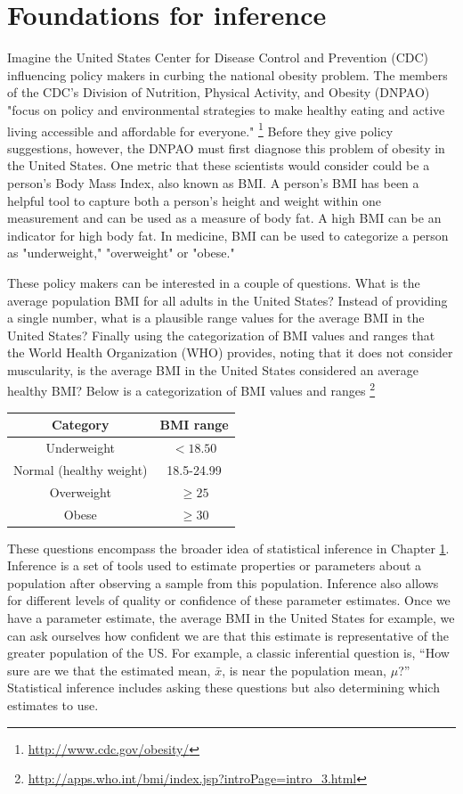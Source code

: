 \chapter{Foundations for inference}
\label{foundationsForInference}

Imagine the United States Center for Disease Control and Prevention (CDC) influencing policy makers in curbing the national obesity problem. The members of the CDC's Division of Nutrition, Physical Activity, and Obesity (DNPAO) "focus on policy and environmental strategies to make healthy eating and active living accessible and affordable for everyone." \footnote{\url{http://www.cdc.gov/obesity/}} Before they give policy suggestions, however, the DNPAO must first diagnose this problem of obesity in the United States. One metric that these scientists would consider could be a person's Body Mass Index, also known as BMI. A person's BMI has been a helpful tool to capture both a person's height and weight within one measurement and can be used as a measure of body fat. A high BMI can be an indicator for high body fat. In medicine, BMI can be used to categorize a person as "underweight," "overweight" or "obese." 

These policy makers can be interested in a couple of questions. What is the average population BMI for all adults in the United States? Instead of providing a single number, what is a plausible range values for the average BMI in the United States? Finally using the categorization of BMI values and ranges that the World Health Organization (WHO) provides, noting that it does not consider muscularity, is the average BMI in the United States considered an average healthy BMI? Below is a categorization of BMI values and ranges
\footnote{\url{http://apps.who.int/bmi/index.jsp?introPage=intro_3.html}}

\begin{center}
\begin{tabular}{|c|c|}
\hline 
Category & BMI range\tabularnewline
\hline 
\hline 
Underweight & $<18.50$\tabularnewline
\hline 
Normal (healthy weight) & 18.5-24.99\tabularnewline
\hline 
Overweight & $\geq 25$\tabularnewline
\hline 
Obese & $\geq30$\tabularnewline
\hline 
\end{tabular}
\end{center}

These questions encompass the broader idea of statistical inference in Chapter \ref{foundationsForInference}. Inference is a set of tools used to estimate properties or parameters about a population after observing a sample from this population. Inference also allows for different levels of quality or confidence of these parameter estimates. Once we have a parameter estimate, the average BMI in the United States for example, we can ask ourselves how confident we are that this estimate is representative of the greater population of the US. For example, a classic inferential question is, ``How sure are we that the estimated mean, $\bar{x}$, is near the population mean, $\mu$?'' Statistical inference includes asking these questions but also determining which estimates to use.

